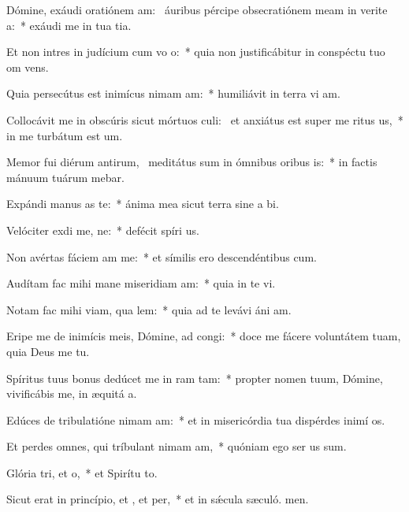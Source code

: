 \item Dómine, exáudi oratiónem am:~\pscross{} áuribus pércipe obsecratiónem meam in verite a:~* exáudi me in tua tia.
\item Et non intres in judícium cum vo o:~* quia non justificábitur in conspéctu tuo om vens.
\item Quia persecútus est inimícus nimam am:~* humiliávit in terra vi am.
\item Collocávit me in obscúris sicut mórtuos culi:~\pscross{} et anxiátus est super me ritus us,~* in me turbátum est  um.
\item Memor fui diérum antirum,~\pscross{} meditátus sum in ómnibus oribus is:~* in factis mánuum tuárum mebar.
\item Expándi manus as  te:~* ánima mea sicut terra sine a bi.
\item Velóciter exdi me, ne:~* defécit spíri us.
\item Non avértas fáciem am  me:~* et símilis ero descendéntibus  cum.
\item Audítam fac mihi mane miseridiam am:~* quia in te vi.
\item Notam fac mihi viam,  qua lem:~* quia ad te levávi áni am.
\item Eripe me de inimícis meis, Dómine, ad  congi:~* doce me fácere voluntátem tuam, quia Deus me  tu.
\item Spíritus tuus bonus dedúcet me in ram tam:~* propter nomen tuum, Dómine, vivificábis me, in æquitá a.
\item Edúces de tribulatióne nimam am:~* et in misericórdia tua dispérdes inimí os.
\item Et perdes omnes, qui tríbulant nimam am,~* quóniam ego ser us sum.
\item Glória tri, et o,~* et Spirítu to.
\item Sicut erat in princípio, et , et per,~* et in sǽcula sæculó. men.
